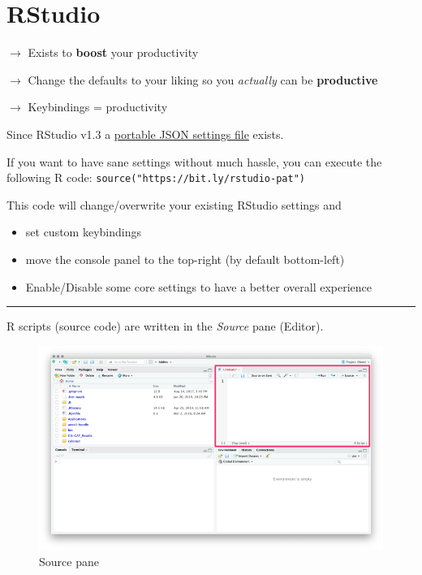 \documentclass[]{book}
\begin{document}
\hypertarget{rstudio}{%
\section{RStudio}\label{rstudio}}

\(\rightarrow\) Exists to \textbf{boost} your productivity

\(\rightarrow\) Change the defaults to your liking so you \emph{actually} can be \textbf{productive}

\(\rightarrow\) Keybindings = productivity

Since RStudio v1.3 a \href{https://docs.rstudio.com/ide/desktop-pro/latest/settings.html\#preferences}{portable JSON settings file} exists.

If you want to have sane settings without much hassle, you can execute the following R code: \texttt{source("https://bit.ly/rstudio-pat")}

This code will change/overwrite your existing RStudio settings and

\begin{itemize}
\item
  set custom keybindings
\item
  move the console panel to the top-right (by default bottom-left)
\item
  Enable/Disable some core settings to have a better overall experience
\end{itemize}

\begin{center}\rule{0.5\linewidth}{\linethickness}\end{center}

R scripts (source code) are written in the \emph{Source} pane (Editor).

\begin{figure}
\centering
\includegraphics{img/rstudio_source_rec.png}
\caption{Source pane}
\end{figure}
\end{document}
